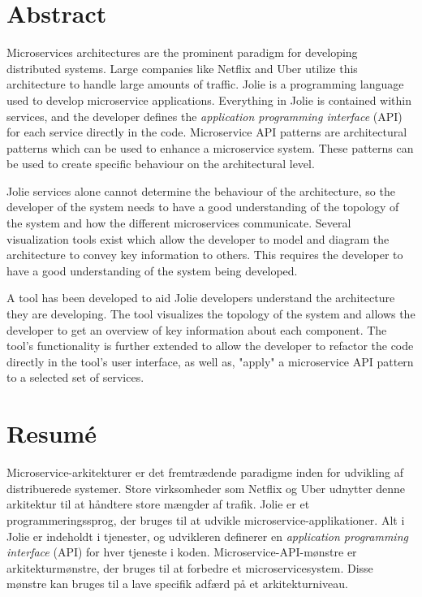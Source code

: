 \section*{\centering Abstract}
Microservices architectures are the prominent paradigm for developing distributed systems.
Large companies like Netflix and Uber utilize this architecture to handle large amounts of traffic.
Jolie is a programming language used to develop microservice applications.
Everything in Jolie is contained within services, and the developer defines the \emph{application programming interface} (API) for each service directly in the code.
Microservice API patterns are architectural patterns which can be used to enhance a microservice system.
These patterns can be used to create specific behaviour on the architectural level.

Jolie services alone cannot determine the behaviour of the architecture, so the developer of the system needs to have a good understanding of the topology of the system and how the different microservices communicate.
Several visualization tools exist which allow the developer to model and diagram the architecture to convey key information to others.
This requires the developer to have a good understanding of the system being developed.

A tool has been developed to aid Jolie developers understand the architecture they are developing. The tool visualizes the topology of the system and allows the developer to 
get an overview of key information about each component. The tool's functionality is further extended to allow the developer to refactor the code directly in the tool's user interface, as well as, "apply" a microservice API pattern to a selected set of services.

\section*{\centering Resumé}
Microservice-arkitekturer er det fremtrædende paradigme inden for udvikling af distribuerede systemer.
Store virksomheder som Netflix og Uber udnytter denne arkitektur til at håndtere store mængder af trafik.
Jolie er et programmeringssprog, der bruges til at udvikle microservice-applikationer.
Alt i Jolie er indeholdt i tjenester, og udvikleren definerer en \emph{application programming interface} (API) for hver tjeneste i koden.
Microservice-API-mønstre er arkitekturmønstre, der bruges til at forbedre et microservicesystem.
Disse mønstre kan bruges til a lave specifik adfærd på et arkitekturniveau.

